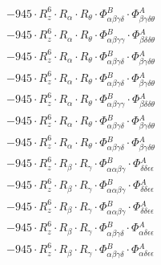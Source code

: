 \documentclass{article}
\begin{document}
\begin{subequations}
\begin{gather}
\begin{array}{c}
 \\[0.2em] 		 - 945 \cdot R_{z}^{6} \cdot R_{\alpha{}} \cdot R_{\theta{}} \cdot \Phi{}^{B}_{\alpha{}\beta{}\gamma{}\delta{}} \cdot \Phi{}^{A}_{\beta{}\gamma{}\delta{}\theta{}} 
 \\[0.2em] 		 - 945 \cdot R_{z}^{6} \cdot R_{\alpha{}} \cdot R_{\theta{}} \cdot \Phi{}^{B}_{\alpha{}\beta{}\gamma{}\gamma{}} \cdot \Phi{}^{A}_{\beta{}\delta{}\delta{}\theta{}} 
 \\[0.2em] 		 - 945 \cdot R_{z}^{6} \cdot R_{\alpha{}} \cdot R_{\theta{}} \cdot \Phi{}^{B}_{\alpha{}\beta{}\gamma{}\delta{}} \cdot \Phi{}^{A}_{\beta{}\gamma{}\delta{}\theta{}} 
 \\[0.2em] 		 - 945 \cdot R_{z}^{6} \cdot R_{\alpha{}} \cdot R_{\theta{}} \cdot \Phi{}^{B}_{\alpha{}\beta{}\gamma{}\delta{}} \cdot \Phi{}^{A}_{\beta{}\gamma{}\delta{}\theta{}} 
 \\[0.2em] 		 - 945 \cdot R_{z}^{6} \cdot R_{\alpha{}} \cdot R_{\theta{}} \cdot \Phi{}^{B}_{\alpha{}\beta{}\gamma{}\gamma{}} \cdot \Phi{}^{A}_{\beta{}\delta{}\delta{}\theta{}} 
 \\[0.2em] 		 - 945 \cdot R_{z}^{6} \cdot R_{\alpha{}} \cdot R_{\theta{}} \cdot \Phi{}^{B}_{\alpha{}\beta{}\gamma{}\delta{}} \cdot \Phi{}^{A}_{\beta{}\gamma{}\delta{}\theta{}} 
 \\[0.2em] 		 - 945 \cdot R_{z}^{6} \cdot R_{\alpha{}} \cdot R_{\theta{}} \cdot \Phi{}^{B}_{\alpha{}\beta{}\gamma{}\delta{}} \cdot \Phi{}^{A}_{\beta{}\gamma{}\delta{}\theta{}} 
 \\[0.2em] 		 - 945 \cdot R_{z}^{6} \cdot R_{\beta{}} \cdot R_{\gamma{}} \cdot \Phi{}^{B}_{\alpha{}\alpha{}\beta{}\gamma{}} \cdot \Phi{}^{A}_{\delta{}\delta{}\epsilon{}\epsilon{}} 
 \\[0.2em] 		 - 945 \cdot R_{z}^{6} \cdot R_{\beta{}} \cdot R_{\gamma{}} \cdot \Phi{}^{B}_{\alpha{}\alpha{}\beta{}\gamma{}} \cdot \Phi{}^{A}_{\delta{}\delta{}\epsilon{}\epsilon{}} 
 \\[0.2em] 		 - 945 \cdot R_{z}^{6} \cdot R_{\beta{}} \cdot R_{\gamma{}} \cdot \Phi{}^{B}_{\alpha{}\alpha{}\beta{}\gamma{}} \cdot \Phi{}^{A}_{\delta{}\delta{}\epsilon{}\epsilon{}} 
 \\[0.2em] 		 - 945 \cdot R_{z}^{6} \cdot R_{\beta{}} \cdot R_{\gamma{}} \cdot \Phi{}^{B}_{\alpha{}\beta{}\gamma{}\delta{}} \cdot \Phi{}^{A}_{\alpha{}\delta{}\epsilon{}\epsilon{}} 
 \\[0.2em] 		 - 945 \cdot R_{z}^{6} \cdot R_{\beta{}} \cdot R_{\gamma{}} \cdot \Phi{}^{B}_{\alpha{}\beta{}\gamma{}\delta{}} \cdot \Phi{}^{A}_{\alpha{}\delta{}\epsilon{}\epsilon{}} 

\end{array}
\end{gather}
\end{subequations}
\end{document}
